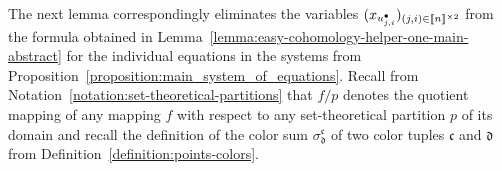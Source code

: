 \documentclass[10pt,a4paper]{amsart}
\numberwithin{equation}{section}
\newcommand{\dwi}[1]{\llbracket{#1}\rrbracket}
\newcommand{\Ssetmonoidalproduct}{\times}
\newcommand{\blpoint}{\mathnormal{\bullet}}
\newcommand{\csfunx}[2]{\sigma^{#1}_{#2}}
\newcommand{\Yc}[1]{\mathfrak{#1}}
\newcommand{\tsquomap}[2]{#1 / #2}
\newcommand{\thedim}{n}
\newcommand{\theuni}{u}
\newcommand{\theunix}[3]{\theuni^{#1}_{#2,#3}}
\begin{document}
{
  \newcommand{\indi}{i}
  \newcommand{\indj}{j}
  \newcommand{\themap}{f}
  \newcommand{\thepartition}{p}
  \newcommand{\incol}{\Yc{c}}
  \newcommand{\outcol}{\Yc{d}}
  \newcommand{\theelim}{(x_{\theunix{\blpoint}{\indj}{\indi}})_{(\indj,\indi)\in\dwi{\thedim}^{\Ssetmonoidalproduct 2}}}
  The next lemma correspondingly eliminates the variables $\theelim$ from the formula obtained in Lem\-ma~\ref{lemma:easy-cohomology-helper-one-main-abstract} for the individual equations in the systems from Pro\-po\-si\-tion~\ref{proposition:main_system_of_equations}. Recall from Notation~\ref{notation:set-theoretical-partitions} that  $\tsquomap{\themap}{\thepartition}$ denotes the quotient mapping of any mapping $\themap$ with respect to any set-theoretical partition $\thepartition$ of its domain and recall the definition of the color sum $\csfunx{\incol}{\outcol}$ of two color tuples $\incol$ and $\outcol$ from  Definition~\ref{definition:points-colors}.
}
\end{document}
